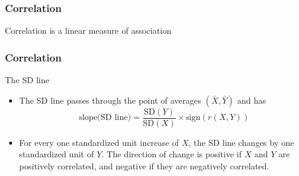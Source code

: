 \documentclass[handout]{beamer}
\begin{document}


   \begin{frame}
   \frametitle{Correlation}
   \begin{center}
   \end{center}
   Correlation is a linear measure of association
   \end{frame}


   \begin{frame} \frametitle{Correlation}

   \begin{block}
   {The SD line}
   \begin{itemize}

   \item The SD line passes through the point of averages $(\bar{X}, \bar{Y})$
   and has
   $$
   \text{slope(SD line)} = \frac{\text{SD}(Y)}{\text{SD}(X)} \times \text{sign}(r(X,Y))
   $$


   \item For every one standardized unit increase of $X$, the SD line
   changes by one standardized unit of $Y$.  The direction of change is positive
   if $X$ and $Y$ are positively correlated, and negative
   if they are negatively correlated.

   \end{itemize}
   \end{block}
   \end{frame}

\end{document}
